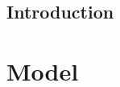 \documentclass[12pt, final]{book}
\begin{document}
\frontmatter

\cleardoublepage
\section*{Introduction}

\tableofcontents
\mainmatter

\chapter{Model}\label{ithimModel}


\end{document}
